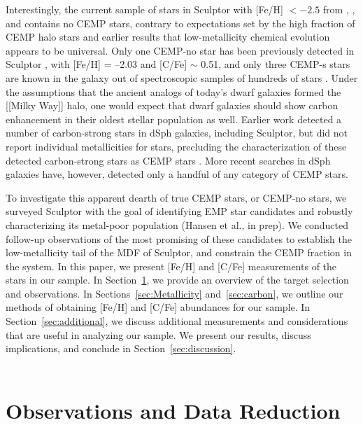 \documentclass{emulateapj-rtx4}
\begin{document}
Interestingly, the current sample of stars in Sculptor with [Fe/H] $<
-2.5$ from \citet{sht+13}, \citet{sjf+15}, and \citet{jnm+15}
contains no CEMP stars, contrary to expectations set by the high fraction of CEMP halo 
stars and earlier results that low-metallicity
chemical evolution appears to be universal. Only one CEMP-no star has been previously detected
in Sculptor \citep{sts+15}, with [Fe/H] = --2.03 and [C/Fe] $\sim$ 0.51, and only
three CEMP-s stars are known in the galaxy out of spectroscopic samples of hundreds of stars \citep{lbp+16,sdy+16}.
Under the assumptions that the ancient analogs of today's dwarf galaxies formed the [[Milky Way]] halo,
one would expect that dwarf galaxies should show carbon enhancement in their 
oldest stellar population as well. Earlier work detected a number of carbon-strong
stars in dSph galaxies, including Sculptor, but did 
not report individual metallicities for stars, precluding the characterization of these detected carbon-strong stars as
CEMP stars \citep{cnn+81, mcf+82, fbc+82, rw+83, aho+83, mc+83, alw+85, alw+86}. 
More recent searches in dSph galaxies \citep{llb+11, sss+13, sht+13,
sts+15, kgz+15, sks+17} have, however, detected only a handful of any category of CEMP stars. 

To investigate this apparent dearth of true CEMP stars, or CEMP-no stars, we surveyed Sculptor with the goal of identifying 
EMP star candidates and robustly characterizing its metal-poor population (Hansen et al., in prep). 
We conducted follow-up observations of the
most promising of these candidates to establish the low-metallicity tail of the MDF of 
Sculptor, and constrain the CEMP fraction in the system. 
In this paper, we present [Fe/H] and [C/Fe] measurements of the stars in our sample.
In Section~\ref{sec:obs}, we provide an overview of the target
selection and observations. In Sections~\ref{sec:Metallicity} and~\ref{sec:carbon}, we outline our methods
of obtaining [Fe/H] and [C/Fe] abundances for our sample. In Section~\ref{sec:additional},
we discuss additional measurements and considerations that are useful in analyzing our sample. We present
our results, discuss implications, and conclude in Section~\ref{sec:discussion}.\\\\

\section{Observations and Data Reduction}
\label{sec:obs}
\end{document}
